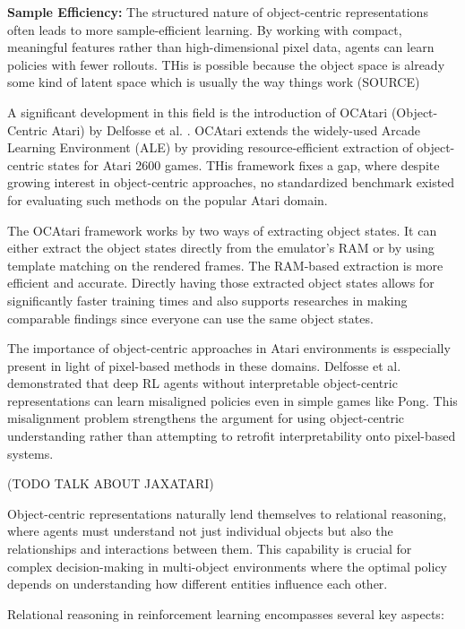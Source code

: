 \documentclass[
	english,
	ruledheaders=section,
	class=report,
	thesis={type=master},
	accentcolor=9c,
	custommargins=true,
	marginpar=false,
	parskip=half-,
	fontsize=11pt,
]{tudapub}
\begin{document}
\textbf{Sample Efficiency:} The structured nature of object-centric representations often leads to more sample-efficient learning. By working with compact, meaningful features rather than high-dimensional
pixel data, agents can learn policies with fewer rollouts. THis is possible because the object space is already some kind of latent space which is usually the way things work (SOURCE)

A significant development in this field is the introduction of OCAtari
(Object-Centric Atari) by Delfosse et al.
\cite{delfosse2024ocatariobjectcentricatari2600}. OCAtari extends the
widely-used Arcade Learning Environment (ALE) by providing resource-efficient
extraction of object-centric states for Atari 2600 games. THis framework fixes
a gap, where despite growing interest in object-centric approaches, no
standardized benchmark existed for evaluating such methods on the popular Atari
domain.

The OCAtari framework works by two ways of extracting object states. It can
either extract the object states directly from the emulator's RAM or by using
template matching on the rendered frames. The RAM-based extraction is more
efficient and accurate. Directly having those extracted object states allows
for significantly faster training times and also supports researches in making
comparable findings since everyone can use the same object states.

The importance of object-centric approaches in Atari environments is
esspecially present in light of pixel-based methods in these domains. Delfosse
et al. demonstrated that deep RL agents without interpretable object-centric
representations can learn misaligned policies even in simple games like Pong.
\cite{delfosse2024interpretableconceptbottlenecksalign} This misalignment
problem strengthens the argument for using object-centric understanding rather
than attempting to retrofit interpretability onto pixel-based systems.

(TODO TALK ABOUT JAXATARI)

Object-centric representations naturally lend themselves to relational
reasoning, where agents must understand not just individual objects but also
the relationships and interactions between them. This capability is crucial for
complex decision-making in multi-object environments where the optimal policy
depends on understanding how different entities influence each other.

Relational reasoning in reinforcement learning encompasses several key aspects:
\end{document}
